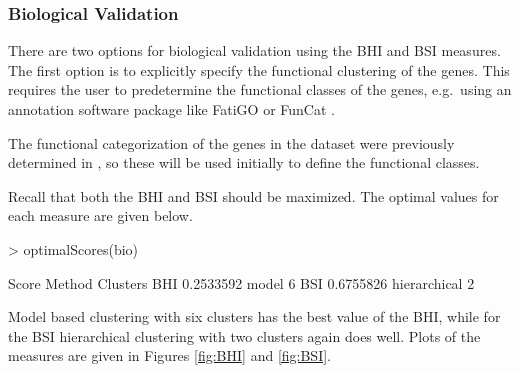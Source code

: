\documentclass[11pt]{article}
\begin{document}
\subsubsection*{Biological Validation}


There are two options for biological validation using the BHI and BSI
measures.  The first option is to explicitly 
specify the functional clustering of the genes.  This requires the
user to predetermine the functional classes of the genes, e.g.~using
an annotation software package like FatiGO \citep{Al2004} or FunCat \citep{Rue2004}.



The functional categorization of the genes in the dataset  were previously determined in
\citet{Bha2007}, so these will be used initially to define the
functional classes.  

\begin{Schunk}
\end{Schunk}


Recall that both the BHI and BSI should be maximized.  The optimal values for each measure are given below.
\begin{Schunk}
\begin{Sinput}
> optimalScores(bio)
\end{Sinput}
\begin{Soutput}
        Score       Method Clusters
BHI 0.2533592        model        6
BSI 0.6755826 hierarchical        2
\end{Soutput}
\end{Schunk}
Model based clustering with six clusters has the best value of the
BHI, while for the BSI hierarchical clustering with two clusters again
does well.  Plots of the measures are given in Figures \ref{fig:BHI} and \ref{fig:BSI}. 
\end{document}
